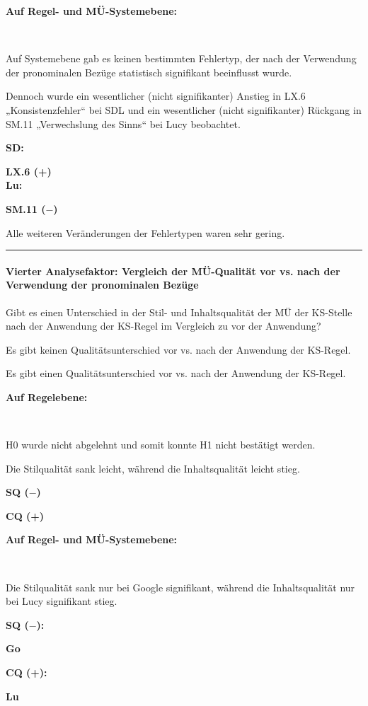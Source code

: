 \noindent
\parbox[t]{.8\textwidth}{\textbf{Auf Regel- und MÜ-Systemebene:}}\\
\parbox[t]{.8\textwidth}{
Auf Systemebene gab es keinen bestimmten Fehlertyp, der nach der Verwendung der pronominalen Bezüge statistisch signifikant beeinflusst wurde.

Dennoch wurde ein wesentlicher (nicht signifikanter) Anstieg in LX.6 „Konsistenzfehler“ bei SDL und ein wesentlicher (nicht signifikanter) Rückgang in SM.11 „Verwechslung des Sinns“ bei Lucy beobachtet.
}
\parbox[t]{.04\textwidth}{}
\parbox[t]{.15\textwidth}{
{ \textbf{SD:}}

{ \textbf{LX.6 (+)}}\\

{ \textbf{Lu:}}

 \textbf{SM.11 ($-$)}
}

\medskip
\noindent
\parbox[t]{.8\textwidth}{Alle weiteren Veränderungen der Fehlertypen waren sehr gering.}

\hrule
\paragraph*{Vierter Analysefaktor: Vergleich der MÜ-Qualität vor vs. nach der Verwendung der pronominalen Bezüge}
\begin{description}[font=\normalfont\bfseries]
\item [Fragestellung:] Gibt es einen Unterschied in der Stil- und Inhaltsqualität der MÜ der KS-Stelle nach der Anwendung der KS-Regel im Vergleich zu vor der Anwendung?
\item [H0 --] Es gibt keinen Qualitätsunterschied vor vs. nach der Anwendung der KS-Regel.
\item [H1 --] Es gibt einen Qualitätsunterschied vor vs. nach der Anwendung der KS-Regel.
\item [Resultat]
\end{description}
\noindent
\parbox[t]{.75\textwidth}{\textbf{Auf Regelebene:}}\\
\parbox[t]{.75\textwidth}{
H0 wurde nicht abgelehnt und somit konnte H1 nicht bestätigt werden.

Die Stilqualität sank leicht, während die Inhaltsqualität leicht stieg.
}
\parbox[t]{.04\textwidth}{}
\parbox[t]{.2\textwidth}{
{ \textbf{SQ ($-$)}}

 \textbf{CQ (+)}
}

\noindent
\parbox[t]{.75\textwidth}{\textbf{Auf Regel- und MÜ-Systemebene:}}\\
\parbox[t]{.75\textwidth}{
Die Stilqualität sank nur bei Google signifikant, während die Inhaltsqualität nur bei Lucy signifikant stieg.
}
\parbox[t]{.04\textwidth}{}
\colorbox{smGreen}{\parbox[t]{.09\textwidth}{
{ \textbf{SQ ($-$):}}

 \textbf{Go}
 }}
\colorbox{smGreen}{\parbox[t]{.09\textwidth}{
{ \textbf{CQ (+):}}

 \textbf{Lu}
}}


